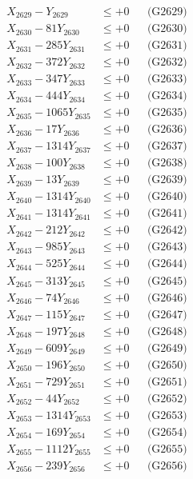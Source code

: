 \documentclass[a4paper,10pt]{article}
\begin{document}
{\begin{align}
X_{2629} - Y_{2629} &\leq +0 && \text{(G2629)} \\
X_{2630} - 81Y_{2630} &\leq +0 && \text{(G2630)} \\
\allowbreak
X_{2631} - 285Y_{2631} &\leq +0 && \text{(G2631)} \\
X_{2632} - 372Y_{2632} &\leq +0 && \text{(G2632)} \\
X_{2633} - 347Y_{2633} &\leq +0 && \text{(G2633)} \\
X_{2634} - 444Y_{2634} &\leq +0 && \text{(G2634)} \\
X_{2635} - 1065Y_{2635} &\leq +0 && \text{(G2635)} \\
X_{2636} - 17Y_{2636} &\leq +0 && \text{(G2636)} \\
X_{2637} - 1314Y_{2637} &\leq +0 && \text{(G2637)} \\
X_{2638} - 100Y_{2638} &\leq +0 && \text{(G2638)} \\
X_{2639} - 13Y_{2639} &\leq +0 && \text{(G2639)} \\
X_{2640} - 1314Y_{2640} &\leq +0 && \text{(G2640)} \\
\allowbreak
X_{2641} - 1314Y_{2641} &\leq +0 && \text{(G2641)} \\
X_{2642} - 212Y_{2642} &\leq +0 && \text{(G2642)} \\
X_{2643} - 985Y_{2643} &\leq +0 && \text{(G2643)} \\
X_{2644} - 525Y_{2644} &\leq +0 && \text{(G2644)} \\
X_{2645} - 313Y_{2645} &\leq +0 && \text{(G2645)} \\
X_{2646} - 74Y_{2646} &\leq +0 && \text{(G2646)} \\
X_{2647} - 115Y_{2647} &\leq +0 && \text{(G2647)} \\
X_{2648} - 197Y_{2648} &\leq +0 && \text{(G2648)} \\
X_{2649} - 609Y_{2649} &\leq +0 && \text{(G2649)} \\
X_{2650} - 196Y_{2650} &\leq +0 && \text{(G2650)} \\
\allowbreak
X_{2651} - 729Y_{2651} &\leq +0 && \text{(G2651)} \\
X_{2652} - 44Y_{2652} &\leq +0 && \text{(G2652)} \\
X_{2653} - 1314Y_{2653} &\leq +0 && \text{(G2653)} \\
X_{2654} - 169Y_{2654} &\leq +0 && \text{(G2654)} \\
X_{2655} - 1112Y_{2655} &\leq +0 && \text{(G2655)} \\
X_{2656} - 239Y_{2656} &\leq +0 && \text{(G2656)} \\

\end{align}}
\end{document}
